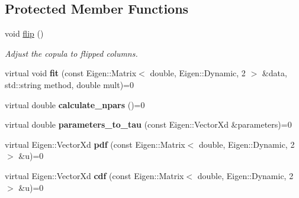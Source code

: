 \subsection*{Protected Member Functions}
\begin{DoxyCompactItemize}
\item 
\hypertarget{classvinecopulib_1_1_abstract_bicop_a4e62970bb8e533f97f66c280c1a908cf}{void \hyperlink{classvinecopulib_1_1_abstract_bicop_a4e62970bb8e533f97f66c280c1a908cf}{flip} ()}\label{classvinecopulib_1_1_abstract_bicop_a4e62970bb8e533f97f66c280c1a908cf}

\begin{DoxyCompactList}\small\item\em Adjust the copula to flipped columns. \end{DoxyCompactList}\item 
\hypertarget{classvinecopulib_1_1_abstract_bicop_a9cce328189e4637ef86e11fbf4e12a4a}{virtual void {\bfseries fit} (const Eigen\+::\+Matrix$<$ double, Eigen\+::\+Dynamic, 2 $>$ \&data, std\+::string method, double mult)=0}\label{classvinecopulib_1_1_abstract_bicop_a9cce328189e4637ef86e11fbf4e12a4a}

\item 
\hypertarget{classvinecopulib_1_1_abstract_bicop_af460c2a5a6d2743080b3a883182cd78e}{virtual double {\bfseries calculate\+\_\+npars} ()=0}\label{classvinecopulib_1_1_abstract_bicop_af460c2a5a6d2743080b3a883182cd78e}

\item 
\hypertarget{classvinecopulib_1_1_abstract_bicop_a71ba68887d581483bd51697885dc2d8c}{virtual double {\bfseries parameters\+\_\+to\+\_\+tau} (const Eigen\+::\+Vector\+Xd \&parameters)=0}\label{classvinecopulib_1_1_abstract_bicop_a71ba68887d581483bd51697885dc2d8c}

\item 
\hypertarget{classvinecopulib_1_1_abstract_bicop_a4594c3b99a7f2d949a52bf177b1651c3}{virtual Eigen\+::\+Vector\+Xd {\bfseries pdf} (const Eigen\+::\+Matrix$<$ double, Eigen\+::\+Dynamic, 2 $>$ \&u)=0}\label{classvinecopulib_1_1_abstract_bicop_a4594c3b99a7f2d949a52bf177b1651c3}

\item 
\hypertarget{classvinecopulib_1_1_abstract_bicop_ab19e2bef5d2ad235f2e4a31fd206bfd4}{virtual Eigen\+::\+Vector\+Xd {\bfseries cdf} (const Eigen\+::\+Matrix$<$ double, Eigen\+::\+Dynamic, 2 $>$ \&u)=0}\label{classvinecopulib_1_1_abstract_bicop_ab19e2bef5d2ad235f2e4a31fd206bfd4}


\end{DoxyCompactItemize}
